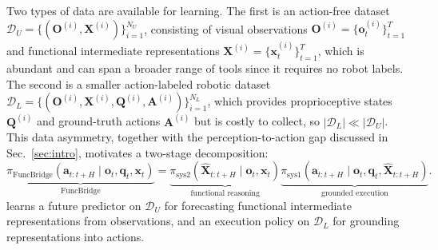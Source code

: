 Two types of data are available for learning. The first is an action-free dataset $\mathcal{D}_{U}=\{(\mathbf{O}^{(i)}, \mathbf{X}^{(i)})\}_{i=1}^{N_U}$, consisting of visual observations $\mathbf{O}^{(i)}=\{\mathbf{o}^{(i)}_t\}_{t=1}^{T}$ and functional intermediate representations $\mathbf{X}^{(i)}=\{\mathbf{x}^{(i)}_t\}_{t=1}^{T}$, which is abundant and can span a broader range of tools since it requires no robot labels.
The second is a smaller action-labeled robotic dataset $\mathcal{D}_{L}=\{(\mathbf{O}^{(i)}, \mathbf{X}^{(i)}, \mathbf{Q}^{(i)}, \mathbf{A}^{(i)})\}_{i=1}^{N_L}$, which provides proprioceptive states $\mathbf{Q}^{(i)}$ and ground-truth actions $\mathbf{A}^{(i)}$ but is costly to collect, so $|\mathcal{D}_L| \ll |\mathcal{D}_U|$. This data asymmetry, together with the perception-to-action gap discussed in Sec.~\ref{sec:intro}, motivates a two-stage decomposition: 
\begin{equation}
\underbrace{
\pi_{\mathrm{FuncBridge}}(
\mathbf{a}_{t:t+H} \mid \mathbf{o}_{t}, \mathbf{q}_{t}, \mathbf{x}_{t}
)
}_{\text{FuncBridge}}=
\underbrace{
\pi_{\mathrm{sys2}}(
\hat{\mathbf{X}}_{t:t+H} \mid \mathbf{o}_{t}, \mathbf{x}_{t}
)
}_{\text{functional reasoning}}
\underbrace{
\pi_{\mathrm{sys1}}(
\mathbf{a}_{t:t+H} \mid \mathbf{o}_{t}, \mathbf{q}_{t}, \hat{\mathbf{X}}_{t:t+H}
)
}_{\text{grounded execution}} .
\label{eq:forge_decomposition}
\end{equation}
\algoname{} learns a future predictor on $\mathcal{D}_U$ for forecasting functional intermediate representations from observations, and an execution policy on $\mathcal{D}_L$ for grounding representations into actions.






